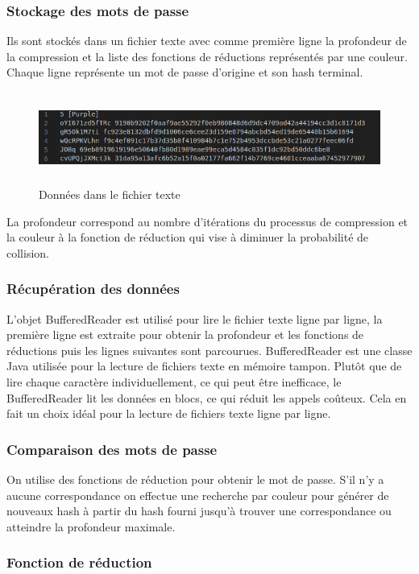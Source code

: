 \documentclass[a4paper,12pt]{article}
\begin{document}
    \subsubsection{Stockage des mots de passe}
    Ils sont stockés dans un fichier texte avec comme première ligne la profondeur de la compression et la liste des fonctions de réductions représentés par une couleur. Chaque ligne représente un mot de passe d’origine et son hash terminal.
    \begin{figure}[H]
    \centering
    \includegraphics[height=3cm]{img/mdp.png}
    \caption{Données dans le fichier texte}
    \end{figure}
La profondeur correspond au nombre d'itérations du processus de compression et la couleur à la fonction de réduction qui vise à diminuer la probabilité de collision.

    \subsubsection{Récupération des données}
    L'objet BufferedReader est utilisé pour lire le fichier texte ligne par ligne, la première ligne est extraite pour obtenir la profondeur et les fonctions de réductions puis les lignes suivantes sont parcourues. BufferedReader est une classe Java utilisée pour la lecture de fichiers texte en mémoire tampon. Plutôt que de lire chaque caractère individuellement, ce qui peut être inefficace, le BufferedReader lit les données en blocs, ce qui réduit les appels coûteux. Cela en fait un choix idéal pour la lecture de fichiers texte ligne par ligne.
    
    \subsubsection{Comparaison des mots de passe}
    On utilise des fonctions de réduction pour obtenir le mot de passe. S'il n'y a aucune correspondance on effectue une recherche par couleur pour générer de nouveaux hash à partir du hash fourni jusqu’à trouver une correspondance ou atteindre la profondeur maximale.
    
    \subsubsection{Fonction de réduction}
\end{document}
